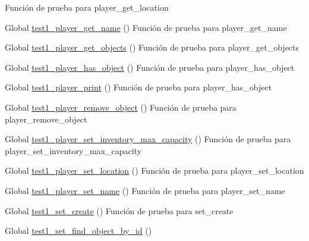 \begin{DoxyRefList}
%
Función de prueba para player\+\_\+get\+\_\+location  
\item[Global \mbox{\hyperlink{player__test_8c_a94068667d8faa66a4ad293dd2c60f2ef}{test1\+\_\+player\+\_\+get\+\_\+name}} ()]\label{test__test000156}%
%
Función de prueba para player\+\_\+get\+\_\+name  
\item[Global \mbox{\hyperlink{player__test_8c_acbc756696bb48f1c106563b79e867693}{test1\+\_\+player\+\_\+get\+\_\+objects}} ()]\label{test__test000161}%
%
Función de prueba para player\+\_\+get\+\_\+objects  
\item[Global \mbox{\hyperlink{player__test_8c_abedc0e75ebffb4e7224f5e5ac0ee3055}{test1\+\_\+player\+\_\+has\+\_\+object}} ()]\label{test__test000174}%
%
Función de prueba para player\+\_\+has\+\_\+object  
\item[Global \mbox{\hyperlink{player__test_8c_a7783d860e6e5f7c28befc5d2d30af08b}{test1\+\_\+player\+\_\+print}} ()]\label{test__test000182}%
%
Función de prueba para player\+\_\+has\+\_\+object  
\item[Global \mbox{\hyperlink{player__test_8c_a0685839b423f685dcdabb7b9fe411cd1}{test1\+\_\+player\+\_\+remove\+\_\+object}} ()]\label{test__test000166}%
%
Función de prueba para player\+\_\+remove\+\_\+object  
\item[Global \mbox{\hyperlink{player__test_8c_aed1d8026a0c56c42a1a9d89b887a5e4d}{test1\+\_\+player\+\_\+set\+\_\+inventory\+\_\+max\+\_\+capacity}} ()]\label{test__test000179}%
%
Función de prueba para player\+\_\+set\+\_\+inventory\+\_\+max\+\_\+capacity  
\item[Global \mbox{\hyperlink{player__test_8c_aec6799a4f46c3f3c471fcb668addcad4}{test1\+\_\+player\+\_\+set\+\_\+location}} ()]\label{test__test000169}%
%
Función de prueba para player\+\_\+set\+\_\+location  
\item[Global \mbox{\hyperlink{player__test_8c_a9d87c09e6af910d695265e3fd77ae3a2}{test1\+\_\+player\+\_\+set\+\_\+name}} ()]\label{test__test000153}%
%
Función de prueba para player\+\_\+set\+\_\+name  
\item[Global \mbox{\hyperlink{set__test_8c_a6f654ab4b44e8a9b9cedfb78c378a5d7}{test1\+\_\+set\+\_\+create}} ()]\label{test__test000185}%
%
Función de prueba para set\+\_\+create  
\item[Global \mbox{\hyperlink{set__test_8c_a4e1cb4b064b88a074cc4e144827d03dd}{test1\+\_\+set\+\_\+find\+\_\+object\+\_\+by\+\_\+id}} ()]\label{test__test000204}%

\end{DoxyRefList}
